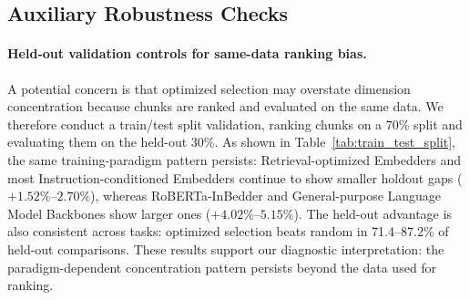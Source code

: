 \documentclass[11pt]{article}
\begin{document}
\begin{table}[t]
    \centering
    \small
    \caption{Held-out validation of optimized selection. 
Chunks are ranked on 70\% of each task and evaluated on the remaining 30\%. 
\textbf{Holdout Gap} is optimized--random gap on held-out data; 
\textbf{Same-Data Gap} is the drop from same-data to held-out evaluation.}
    \label{tab:train_test_split}
\end{table}

\subsection{Auxiliary Robustness Checks}
\label{sec:aux_results}
\paragraph{Held-out validation controls for same-data ranking bias.}
A potential concern is that optimized selection may overstate dimension concentration because chunks are ranked and evaluated on the same data. We therefore conduct a train/test split validation, ranking chunks on a 70\% split and evaluating them on the held-out 30\%. As shown in Table~\ref{tab:train_test_split}, the same training-paradigm pattern persists: Retrieval-optimized Embedders and most Instruction-conditioned Embedders continue to show smaller holdout gaps ($+1.52\%$--$2.70\%$), whereas RoBERTa-InBedder and General-purpose Language Model Backbones show larger ones ($+4.02\%$--$5.15\%$). The held-out advantage is also consistent across tasks: optimized selection beats random in 71.4--87.2\% of held-out comparisons. These results support our diagnostic interpretation: the paradigm-dependent concentration pattern persists beyond the data used for ranking.
\end{document}
